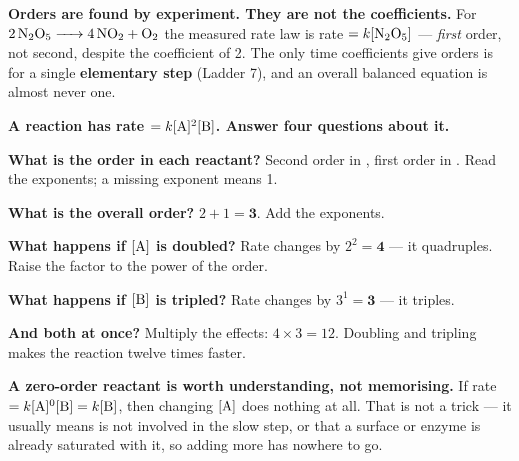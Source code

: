 \documentclass{apchem-worksheet}
\begin{document}
\begin{apctrap}
\textbf{Orders are found by experiment. They are not the coefficients.}
For $\ce{2N2O5 -> 4NO2 + O2}$ the measured rate law is
rate $= k[\ce{N2O5}]$ --- \emph{first} order, not second, despite the
coefficient of 2. The only time coefficients give orders is for a single
\textbf{elementary step} (Ladder 7), and an overall balanced equation is
almost never one.
\end{apctrap}

\begin{workedexample}
\textbf{A reaction has rate $= k[\ce{A}]^{2}[\ce{B}]$. Answer four
questions about it.}

\textbf{What is the order in each reactant?} Second order in ,
first order in . Read the exponents; a missing exponent means 1.

\textbf{What is the overall order?} $2 + 1 = \mathbf{3}$. Add the
exponents.

\textbf{What happens if $[\ce{A}]$ is doubled?} Rate changes by
$2^{2} = \mathbf{4}$ --- it quadruples. Raise the factor to the power of
the order.

\textbf{What happens if $[\ce{B}]$ is tripled?} Rate changes by
$3^{1} = \mathbf{3}$ --- it triples.

\textbf{And both at once?} Multiply the effects: $4 \times 3 = 12$.
Doubling  and tripling  makes the reaction twelve times
faster.

\textbf{A zero-order reactant is worth understanding, not memorising.}
If rate $= k[\ce{A}]^{0}[\ce{B}] = k[\ce{B}]$, then changing
$[\ce{A}]$ does nothing at all. That is not a trick --- it usually means
 is not involved in the slow step, or that a surface or enzyme is
already saturated with it, so adding more has nowhere to go.
\end{workedexample}
\end{document}
